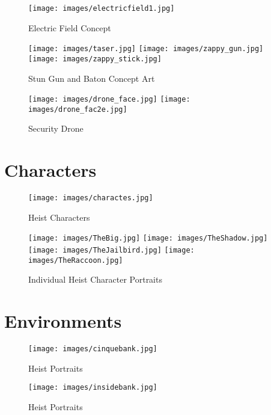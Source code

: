 \documentclass[11pt]{report}
\begin{document}
\begin{figure}[H]
	\texttt{[image: images/electricfield1.jpg]}
    \caption{Electric Field Concept}
\end{figure}

\begin{figure}[H]
    \centering
	\texttt{[image: images/taser.jpg]}
	\texttt{[image: images/zappy\_gun.jpg]}
	\texttt{[image: images/zappy\_stick.jpg]}
    \caption{Stun Gun and Baton Concept Art}
\end{figure}

\begin{figure}[H]
    \centering
	\texttt{[image: images/drone\_face.jpg]}
	\texttt{[image: images/drone\_fac2e.jpg]}
    \caption{Security Drone}
\end{figure}

\section{Characters}

\begin{figure}[H]
	\texttt{[image: images/charactes.jpg]}
    \caption{Heist Characters}
\end{figure}

\begin{figure}[H]
    \centering
	\texttt{[image: images/TheBig.jpg]}
	\texttt{[image: images/TheShadow.jpg]}
	\texttt{[image: images/TheJailbird.jpg]}
	\texttt{[image: images/TheRaccoon.jpg]}
    \caption{Individual Heist Character Portraits}
\end{figure}

\section{Environments}

\begin{figure}[H]
    \centering
	\texttt{[image: images/cinquebank.jpg]}
    \caption{Heist Portraits}
\end{figure}

\begin{figure}[H]
    \centering
	\texttt{[image: images/insidebank.jpg]}
    \caption{Heist Portraits}
\end{figure}
\end{document}
